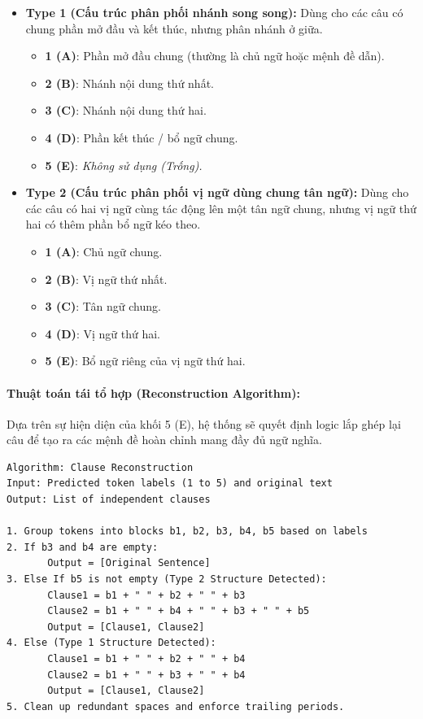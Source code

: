 \begin{itemize}
    \item \textbf{Type 1 (Cấu trúc phân phối nhánh song song):} Dùng cho các câu có chung phần mở đầu và kết thúc, nhưng phân nhánh ở giữa.
    \begin{itemize}
        \item \textbf{1 (A)}: Phần mở đầu chung (thường là chủ ngữ hoặc mệnh đề dẫn).
        \item \textbf{2 (B)}: Nhánh nội dung thứ nhất.
        \item \textbf{3 (C)}: Nhánh nội dung thứ hai.
        \item \textbf{4 (D)}: Phần kết thúc / bổ ngữ chung.
        \item \textbf{5 (E)}: \textit{Không sử dụng (Trống).}
    \end{itemize}
    \item \textbf{Type 2 (Cấu trúc phân phối vị ngữ dùng chung tân ngữ):} Dùng cho các câu có hai vị ngữ cùng tác động lên một tân ngữ chung, nhưng vị ngữ thứ hai có thêm phần bổ ngữ kéo theo.
    \begin{itemize}
        \item \textbf{1 (A)}: Chủ ngữ chung.
        \item \textbf{2 (B)}: Vị ngữ thứ nhất.
        \item \textbf{3 (C)}: Tân ngữ chung.
        \item \textbf{4 (D)}: Vị ngữ thứ hai.
        \item \textbf{5 (E)}: Bổ ngữ riêng của vị ngữ thứ hai.
    \end{itemize}
\end{itemize}

\paragraph{Thuật toán tái tổ hợp (Reconstruction Algorithm):}
Dựa trên sự hiện diện của khối 5 (E), hệ thống sẽ quyết định logic lắp ghép lại câu để tạo ra các mệnh đề hoàn chỉnh mang đầy đủ ngữ nghĩa.

\begin{verbatim}
Algorithm: Clause Reconstruction
Input: Predicted token labels (1 to 5) and original text
Output: List of independent clauses

1. Group tokens into blocks b1, b2, b3, b4, b5 based on labels
2. If b3 and b4 are empty:
       Output = [Original Sentence]
3. Else If b5 is not empty (Type 2 Structure Detected):
       Clause1 = b1 + " " + b2 + " " + b3
       Clause2 = b1 + " " + b4 + " " + b3 + " " + b5
       Output = [Clause1, Clause2]
4. Else (Type 1 Structure Detected):
       Clause1 = b1 + " " + b2 + " " + b4
       Clause2 = b1 + " " + b3 + " " + b4
       Output = [Clause1, Clause2]
5. Clean up redundant spaces and enforce trailing periods.
\end{verbatim}

